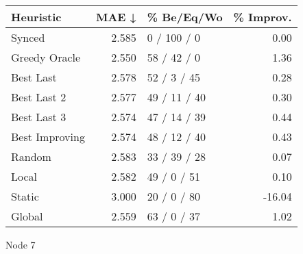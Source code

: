 \begin{tabular}{lrlr}
\toprule
\textbf{Heuristic} & \textbf{MAE ↓} & \textbf{\% Be/Eq/Wo} & \textbf{\% Improv.} \\
\midrule
            Synced &          2.585 &          0 / 100 / 0 &                0.00 \\
     Greedy Oracle &          2.550 &          58 / 42 / 0 &                1.36 \\
         Best Last &          2.578 &          52 / 3 / 45 &                0.28 \\
       Best Last 2 &          2.577 &         49 / 11 / 40 &                0.30 \\
       Best Last 3 &          2.574 &         47 / 14 / 39 &                0.44 \\
    Best Improving &          2.574 &         48 / 12 / 40 &                0.43 \\
            Random &          2.583 &         33 / 39 / 28 &                0.07 \\
             Local &          2.582 &          49 / 0 / 51 &                0.10 \\
            Static &          3.000 &          20 / 0 / 80 &              -16.04 \\
            Global &          2.559 &          63 / 0 / 37 &                1.02 \\
\bottomrule
\end{tabular}
\caption{Node 7}
\label{tab:hr_iid_lr01_le1_bs4_7}
